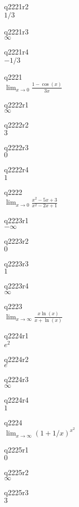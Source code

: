 q2221r2\\
\(\displaystyle 1/3 \)

q2221r3\\
\(\displaystyle \infty \)

q2221r4\\
\(\displaystyle -1/3 \)

q2221\\
\(\displaystyle \lim_{x \rightarrow 0} \frac{1-\cos(x)}{3x} \)

q2222r1\\
\(\displaystyle \infty \)

q2222r2\\
\(\displaystyle 3 \)

q2222r3\\
\(\displaystyle 0 \)

q2222r4\\
\(\displaystyle 1 \)

q2222\\
\(\displaystyle \lim_{x \rightarrow 0} \frac{x^2 - 5x + 3}{x^2 - 2x + 1} \)

q2223r1\\
\(\displaystyle -\infty \)

q2223r2\\
\(\displaystyle 0 \)

q2223r3\\
\(\displaystyle 1 \)

q2223r4\\
\(\displaystyle \infty \)

q2223\\
\(\displaystyle \lim_{x \rightarrow \infty} \frac{x \ln (x)}{x + \ln(x)} \)

q2224r1\\
\(\displaystyle e^2 \)

q2224r2\\
\(\displaystyle e \)

q2224r3\\
\(\displaystyle \infty \)

q2224r4\\
\(\displaystyle 1 \)

q2224\\
\(\displaystyle \lim_{x \rightarrow \infty} (1+1/x)^{x^2} \)

q2225r1\\
\(\displaystyle 0 \)

q2225r2\\
\(\displaystyle \infty \)

q2225r3\\
\(\displaystyle 3 \)

